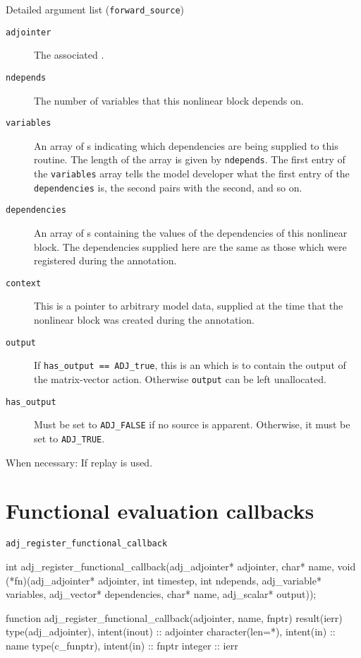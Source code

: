 \begin{boxwithtitle}{Detailed argument list (\texttt{forward_source})}
\begin{description}
\item[\texttt{adjointer}] The associated .
\item[\texttt{ndepends}] The number of variables that this nonlinear block depends on.
\item[\texttt{variables}] An array of s indicating which dependencies are being supplied to this routine. The length of the
array is given by \texttt{ndepends}. The first entry of the \texttt{variables} array
tells the model developer what the first entry of the \texttt{dependencies} is, the second pairs with the second, and so on.
\item[\texttt{dependencies}] An array of s containing the values of the dependencies of this nonlinear block. The dependencies supplied
here are the same as those which were registered during the annotation.
\item[\texttt{context}] This is a pointer to arbitrary model data, supplied at the time that the nonlinear block was created during the annotation.
\item[\texttt{output}] If \texttt{has_output == ADJ_true}, this is an  which is to contain the output of the matrix-vector action. Otherwise \texttt{output} can be left unallocated.
\item[\texttt{has_output}] Must be set to \texttt{ADJ_FALSE} if no source is apparent. Otherwise, it must be set to \texttt{ADJ_TRUE}.
\end{description}
\end{boxwithtitle}

When necessary: 
If replay is used. 

\section{Functional evaluation callbacks}

\begin{boxwithtitle}{\texttt{adj_register_functional_callback}}
\begin{minipage}{\columnwidth}
\begin{ccode}
int adj_register_functional_callback(adj_adjointer* adjointer, char* name, 
                           void (*fn)(adj_adjointer* adjointer, int timestep, 
                                      int ndepends, adj_variable* variables, 
                                      adj_vector* dependencies, char* name, 
                                      adj_scalar* output));
\end{ccode}
\begin{fortrancode}
  function adj_register_functional_callback(adjointer, name, fnptr) result(ierr)
    type(adj_adjointer), intent(inout) :: adjointer
    character(len=*), intent(in) :: name
    type(c_funptr), intent(in) :: fnptr
    integer :: ierr
\end{fortrancode}
\end{minipage}
\end{boxwithtitle}

